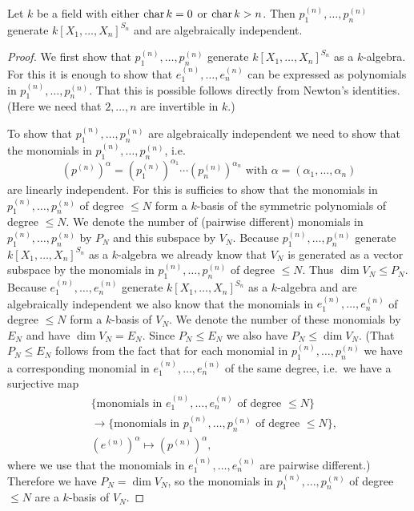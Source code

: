 \begin{thrm}
 Let $k$ be a field with either $\operatorname{char} k = 0$ or $\operatorname{char} k > n$. Then $p^{(n)}_1, \dotsc, p^{(n)}_n$ generate $k[X_1, \dotsc, X_n]^{S_n}$ and are algebraically independent.
\end{thrm}
\begin{proof}
 We first show that $p^{(n)}_1, \dotsc, p^{(n)}_n$ generate $k[X_1, \dotsc, X_n]^{S_n}$ as a $k$-algebra. For this it is enough to show that $e^{(n)}_1, \dotsc, e^{(n)}_n$ can be expressed as polynomials in $p^{(n)}_1, \dotsc, p^{(n)}_n$. That this is possible follows directly from Newton’s identities. (Here we need that $2, \dotsc, n$ are invertible in $k$.)
 
 To show that $p^{(n)}_1, \dotsc, p^{(n)}_n$ are algebraically independent we need to show that the monomials in $p^{(n)}_1, \dotsc, p^{(n)}_n$, i.e.
 \[
  \left(p^{(n)}\right)^\alpha = \left(p^{(n)}_1\right)^{\alpha_1} \dotsm \left(p^{(n)}_n\right)^{\alpha_n} \text{ with } \alpha = (\alpha_1, \dotsc, \alpha_n)
 \]
 are linearly independent. For this is sufficies to show that the monomials in $p^{(n)}_1, \dotsc, p^{(n)}_n$ of degree $\leq N$ form a $k$-basis of the symmetric polynomials of degree $\leq N$. We denote the number of (pairwise different) monomials in $p^{(n)}_1, \dotsc, p^{(n)}_n$ by $P_N$ and this subspace by $V_N$. Because $p^{(n)}_1, \dotsc, p^{(n)}_n$ generate $k[X_1, \dotsc, X_n]^{S_n}$ as a $k$-algebra we already know that $V_N$ is generated as a vector subspace by the monomials in $p^{(n)}_1, \dotsc, p^{(n)}_n$ of degree $\leq N$. Thus $\dim V_N \leq P_N$. Because $e^{(n)}_1, \dotsc, e^{(n)}_n$ generate $k[X_1, \dotsc, X_n]^{S_n}$ as a $k$-algebra and are algebraically independent we also know that the monomials in $e^{(n)}_1, \dotsc, e^{(n)}_n$ of degree $\leq N$ form a $k$-basis of $V_N$. We denote the number of these monomials by $E_N$ and have $\dim V_N = E_N$. Since $P_N \leq E_N$ we also have $P_N \leq \dim V_N$. (That $P_N \leq E_N$ follows from the fact that for each monomial in $p^{(n)}_1, \dotsc, p^{(n)}_n$ we have a corresponding monomial in $e^{(n)}_1, \dotsc, e^{(n)}_n$ of the same degree, i.e.\ we have a surjective map
\begin{align*}
    &\, \{\text{monomials in $e^{(n)}_1, \dotsc, e^{(n)}_n$ of degree $\leq N$}\} \\
    &\, \to \{\text{monomials in $p^{(n)}_1, \dotsc, p^{(n)}_n$ of degree $\leq N$}\}, \\
    &\, \left(e^{(n)}\right)^\alpha \mapsto \left(p^{(n)}\right)^\alpha,
\end{align*}
where we use that the monomials in $e^{(n)}_1, \dotsc, e^{(n)}_n$ are pairwise different.)
Therefore we have $P_N = \dim V_N$, so the monomials in $p^{(n)}_1, \dotsc, p^{(n)}_n$ of degree $\leq N$ are a $k$-basis of $V_N$.
\end{proof}


